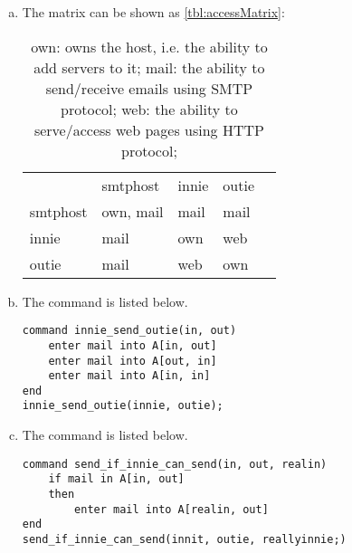 \begin{enumerate}[(a)]
    \item The matrix can be shown as \autoref{tbl:accessMatrix}:


          \begin{table*}[htbp]
              \caption{
                  own: owns the host, i.e. the ability to add servers to it;
                  mail: the ability to send/receive emails using SMTP protocol;
                  web: the ability to serve/access web pages using HTTP protocol;
              }
              \centering
              \begin{tabular}{lllll}
                  \toprule
                             & {smtphost} & {innie} & {outie} & \\

                  \cmidrule(lr){1-5}

                  {smtphost} & own, mail  & mail    & mail    & \\
                  {innie}    & mail       & own     & web     & \\
                  {outie}    & mail       & web     & own     & \\

                  \bottomrule
              \end{tabular}
              \label{tbl:accessMatrix}
          \end{table*}
    \item The command is listed below.

          \begin{minipage}{\linewidth}\begin{lstlisting}
command innie_send_outie(in, out)
    enter mail into A[in, out]
    enter mail into A[out, in]
    enter mail into A[in, in]
end
innie_send_outie(innie, outie);
          \end{lstlisting}\end{minipage}
    \item The command is listed below.

          \begin{minipage}{\linewidth}\begin{lstlisting}
command send_if_innie_can_send(in, out, realin)
    if mail in A[in, out]
    then
        enter mail into A[realin, out]
end
send_if_innie_can_send(innit, outie, reallyinnie;)
          \end{lstlisting}\end{minipage}
\end{enumerate}


